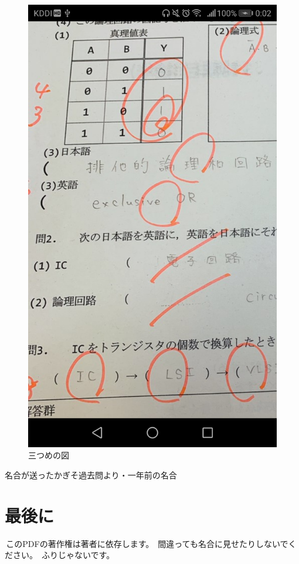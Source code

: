 \documentclass[11pt]{jsarticle}
\begin{document}
\begin{figure}[htbp]
\begin{minipage}{0.33\hsize}
 \begin{center}
  \includegraphics[scale=0.1]{pic3.jpg}
 \end{center}
  \caption{三つめの図}
  \label{fig:three}
 \end{minipage}
\end{figure}

\begin{thebibliography}{数字}
   名合が送ったかぎそ過去問より・一年前の名合
\end{thebibliography}
\newpage
\part{最後に}
\,このPDFの著作権は著者に依存します。
\,間違っても名合に見せたりしないでください。
\,ふりじゃないです。
\end{document}
